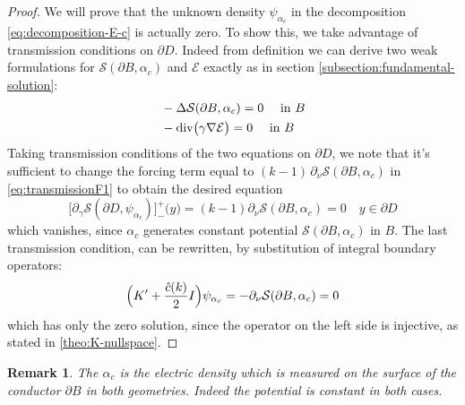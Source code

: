 \documentclass[10pt, a4paper, twoside, openright]{book}
\theoremstyle{definition}
\theoremstyle{plain}
\theoremstyle{plain}
\theoremstyle{plain}
\theoremstyle{plain}
\newtheorem{remark}[subsection]{Remark}
\theoremstyle{plain}
\theoremstyle{plain}
\theoremstyle{plain}
\theoremstyle{plain}
\DeclareMathOperator{\divergence}{div}
\begin{document}
\begin{proof}
We will prove that the unknown density $\psi_{\alpha_c}$ in the decomposition \eqref{eq:decomposition-E-c} is actually zero. To show this, we take advantage of transmission conditions on $\partial D$. 
Indeed from definition we can derive two weak formulations for $\mathcal{S}(\partial B, \alpha_c)$ and $\mathcal{E}$ exactly as in section \ref{subsection:fundamental-solution}:
\begin{align}
 &-\Delta\mathcal{S}(\partial B,\alpha_c) = 0\quad\textup{ in }B\\
 &-\divergence\bigl(\gamma\nabla\mathcal{E}\bigr) = 0\quad\textup{ in }B
\end{align}
Taking transmission conditions of the two equations on $\partial D$, we note that it's sufficient to change the forcing term equal to $(k-1)\,\partial_\nu\mathcal{S}(\partial B, \alpha_{c})$ in \eqref{eq:transmissionF1} to obtain the desired equation
\begin{equation}
 \bigl[\partial_\gamma \mathcal{S}(\partial D,\psi_{\alpha_{c}})\bigr]^+_-\bigl(y\bigr) = (k - 1)\partial_\nu \mathcal{S}(\partial B,\alpha_{c})=0 \quad y \in\partial D
\end{equation}
which vanishes, since $\alpha_{c}$ generates constant potential $\mathcal{S}(\partial B,\alpha_{c})$ in $B$. The last transmission condition, can be rewritten, by substitution of integral boundary operators:
\begin{equation}
 \Bigl(K' + \frac{\hat{c}(k)}{2} I\Bigr)\psi_{\alpha_c} = -\partial_\nu \mathcal{S}(\partial B, \alpha_c) = 0
\end{equation}
which has only the zero solution, since the operator on the left side is injective, as stated in \ref{theo:K-nullspace}.
\end{proof}
\begin{remark}
 The $\alpha_c$ is the electric density which is measured on the surface of the conductor $\partial B$ in both geometries. Indeed the potential is constant in both cases.
\end{remark}
\end{document}
